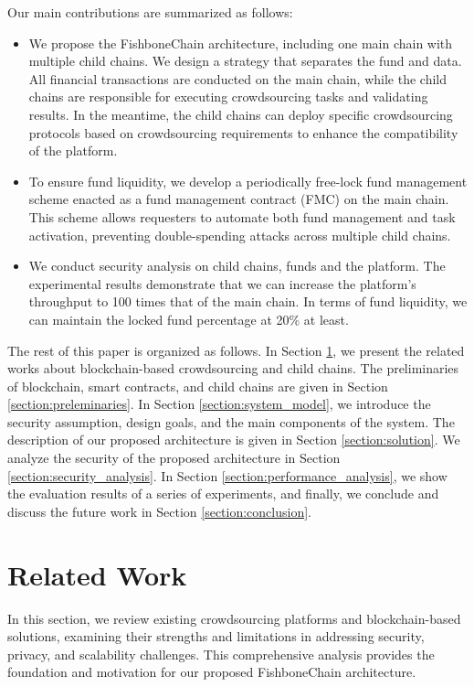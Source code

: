 \documentclass[10pt,journal]{IEEEtran}
\begin{document}
Our main contributions are summarized as follows:

\begin{itemize}
    \item We propose the FishboneChain architecture, including one main chain with multiple child chains. We design a strategy that separates the fund and data. All financial transactions are conducted on the main chain, while the child chains are responsible for executing crowdsourcing tasks and validating results. In the meantime, the child chains can deploy specific crowdsourcing protocols based on crowdsourcing requirements to enhance the compatibility of the platform.
    \item To ensure fund liquidity, we develop a periodically free-lock fund management scheme enacted as a fund management contract (FMC) on the main chain. This scheme allows requesters to automate both fund management and task activation, preventing double-spending attacks across multiple child chains.
    \item We conduct security analysis on child chains, funds and the platform.
    The experimental results demonstrate that we can increase the platform's throughput to 100 times that of the main chain. In terms of fund liquidity, we can maintain the locked fund percentage at 20\% at least.
\end{itemize}

The rest of this paper is organized as follows. In Section \ref{section:related_work}, we present the related works about blockchain-based crowdsourcing and child chains. The preliminaries of blockchain, smart contracts, and child chains are given in Section \ref{section:preleminaries}. In Section \ref{section:system_model}, we introduce the security assumption, design goals, and the main components of the system. The description of our proposed architecture is given in Section \ref{section:solution}. We analyze the security of the proposed architecture in Section \ref{section:security_analysis}. In Section \ref{section:performance_analysis}, we show the evaluation results of a series of experiments, and finally, we conclude and discuss the future work in Section \ref{section:conclusion}.

\section{Related Work} \label{section:related_work}

In this section, we review existing crowdsourcing platforms and blockchain-based solutions, examining their strengths and limitations in addressing security, privacy, and scalability challenges. This comprehensive analysis provides the foundation and motivation for our proposed FishboneChain architecture.
\end{document}
